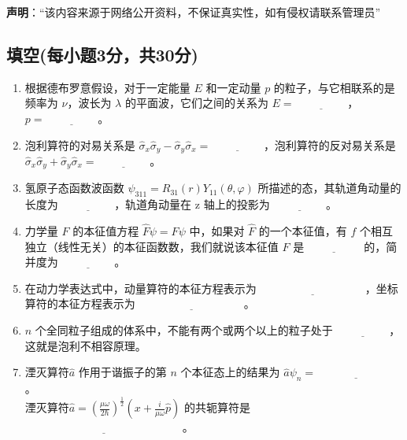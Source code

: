 
\textbf{声明}：“该内容来源于网络公开资料，不保证真实性，如有侵权请联系管理员”

\subsection{填空(每小题3分，共30分)}
\begin{enumerate}
    \item 根据德布罗意假设，对于一定能量 $E$ 和一定动量 $p$ 的粒子，与它相联系的是频率为 $\nu$，波长为 $\lambda$ 的平面波，它们之间的关系为 $E = \underline{\hspace{2cm}}$，$p = \underline{\hspace{2cm}}$。
    
    \item 泡利算符的对易关系是 $\hat \sigma_x \hat \sigma_y - \hat \sigma_y \hat \sigma_x = \underline{\hspace{2cm}}$，泡利算符的反对易关系是 $\hat \sigma_x \hat \sigma_y + \hat \sigma_y \hat \sigma_x = \underline{\hspace{2cm}}$。
    
    \item 氢原子态函数波函数 $\psi_{311} = R_{31}(r) Y_{11}(\theta, \varphi)$ 所描述的态，其轨道角动量的长度为 $\underline{\hspace{2cm}}$，轨道角动量在 z 轴上的投影为 $\underline{\hspace{2cm}}$。
    
    \item 力学量 $F$ 的本征值方程 $\hat F\psi = F\psi$ 中，如果对 $\hat F$ 的一个本征值，有 $f$ 个相互独立（线性无关）的本征函数数，我们就说该本征值 $F$ 是 $\underline{\hspace{2cm}}$ 的，简并度为 $\underline{\hspace{2cm}}$。
    
    \item 在动力学表达式中，动量算符的本征方程表示为 $\underline{\hspace{4cm}}$，坐标算符的本征方程表示为 $\underline{\hspace{4cm}}$。
    
    \item $n$ 个全同粒子组成的体系中，不能有两个或两个以上的粒子处于 $\underline{\hspace{2cm}}$，这就是泡利不相容原理。

    \item 湮灭算符$\hat a$ 作用于谐振子的第 $n$ 个本征态上的结果为 $\hat a\psi_n = \underline{\hspace{3cm}}$。\\
    湮灭算符$\hat a = \left( \frac{\mu \omega}{2\hbar} \right)^{\frac{1}{2}} \left( x + \frac{i}{\mu \omega} \hat{p} \right)$ 的共轭算符是 $\underline{\hspace{6cm}}$。


\end{enumerate}
